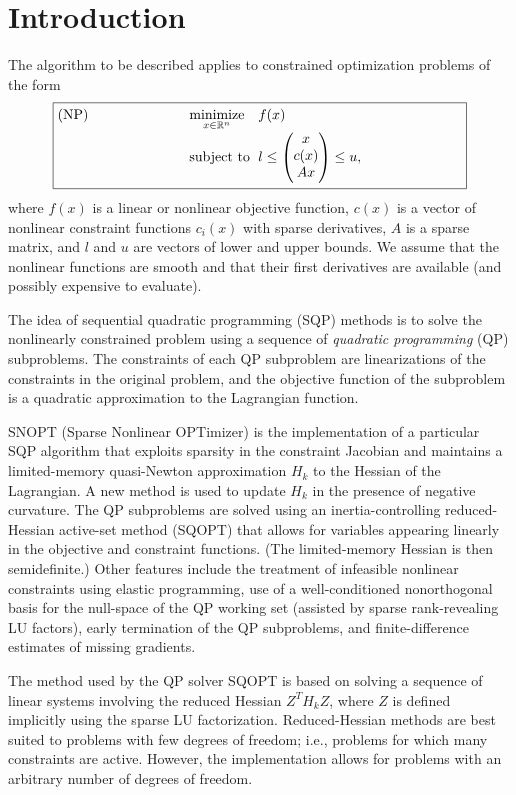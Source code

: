 \documentclass[draft,leqno,onefignum,onetabnum]{siamltex}
\makeatletter
\def\minim{\mathop{\hbox{\rm minimize}}}
\def\minimize#1{{\displaystyle\minim_{#1}}}
\def\subject{\mbox{\rm subject to}}
\def\T{^T\!}
\def\strutl{\rule[-1.25ex]{0pt}{3ex}}%
\def\SNOPT {{\small SNOPT}}
\def\SQOPT {{\small SQOPT}}
\def\problem#1#2#3#4{\fbox
   {\begin{tabular*}{0.84\textwidth}
    {@{}l@{\extracolsep{\fill}}l@{\extracolsep{6pt}}l@{\extracolsep{\fill}}c@{}}
      #1 & $\minimize{#2}$ & $#3$ & $ $ \\[5pt]
         & $\subject$      & $#4$ & $ $
    \end{tabular*}}}
\newcommand{\pmat}[1]{\begin{pmatrix}#1\end{pmatrix}}
\makeatother
\begin{document}
 \section{Introduction}  \label{sec-intro}

The algorithm to be described applies to constrained optimization
problems of the form
$$
   \problem{(NP)}{x \in \mathbb R^n}{f(x)}
      {l \le \pmat{x\\c(x)\\Ax \strutl} \le u,}
$$
where $f(x)$ is a linear or nonlinear objective function,
$c(x)$ is a vector of nonlinear constraint functions $c_i(x)$
with sparse derivatives, $A$ is a sparse matrix, and $l$ and $u$
are vectors of lower and upper bounds.
We assume that the nonlinear functions are smooth and that their first
derivatives are available (and possibly expensive to evaluate).

The idea of sequential quadratic programming (SQP) methods is to solve
the nonlinearly constrained problem using a sequence of
\emph{quadratic programming} (QP) subproblems.  The constraints
of each QP subproblem are linearizations of the constraints in
the original problem, and the objective function of the
subproblem is a quadratic approximation to the Lagrangian function.

\SNOPT{} (Sparse Nonlinear OPTimizer) \cite{SNOPT7} is the
implementation of a particular SQP algorithm that exploits sparsity in
the constraint Jacobian and maintains a limited-memory quasi-Newton
approximation $H_k$ to the Hessian of the Lagrangian.  A new method
is used to update $H_k$ in the presence of negative curvature.  The QP
subproblems are solved using an inertia-controlling reduced-Hessian
active-set method (\SQOPT) that allows for variables appearing
linearly in the objective and constraint functions.  (The
limited-memory Hessian is then semidefinite.)  Other features include
the treatment of infeasible nonlinear constraints using elastic
programming, use of a well-conditioned nonorthogonal basis for the
null-space of the QP working set (assisted by sparse rank-revealing LU
factors), early termination of the QP subproblems, and
finite-difference estimates of missing gradients.

The method used by the QP solver \SQOPT{} is based on solving a sequence of
linear systems involving the reduced Hessian $Z\T H_k Z$, where $Z$ is
defined implicitly using the sparse LU factorization.  Reduced-Hessian
methods are best suited to problems with few degrees of freedom;
i.e., problems for which many constraints are
active.  However, the implementation allows for
problems with an arbitrary number of degrees of freedom.
\end{document}
